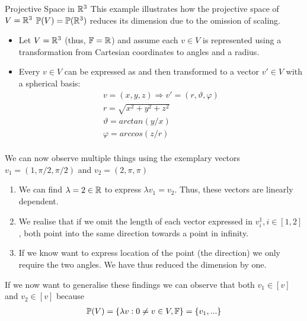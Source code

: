 \begin{exampleBox}{Projective Space in $\mathbb{R}^3$}
    This example illustrates how the projective space of $V = \mathbb{R}^3$ $\mathbb{P}(V) = \mathbb{P}(\mathbb{R}^3)$ reduces its dimension due to the omission of scaling.
    \begin{itemize}
        \item Let $V = \mathbb{R}^3$ (thus, $\mathbb{F} = \mathbb{R}$) and assume each $v \in V$ is represented using a transformation from Cartesian coordinates to angles and a radius.
        \item Every $v \in V$ can be expressed as and then transformed to a vector $v' \in V$ with a spherical basis: 
            \begin{gather*}
                v = (x,y,z) \Rightarrow v' =  (r, \vartheta,\varphi)  \\
                r = \sqrt{x^2+y^2+z^2} \\
                \vartheta = arctan(y/x) \\
                \varphi = arccos(z/r) \\   
            \end{gather*}
    \end{itemize}  
    
    We can now observe multiple things using the exemplary vectors $v_1 = (1, \pi/2,\pi/2)$ and $v_2 = (2, \pi,\pi)$
    \begin{enumerate}
        \item We can find $\lambda = 2 \in \mathbb{R}$ to express $\lambda v_1 = v_2$. Thus, these vectors are linearly dependent.
        \item We realise that if we omit the length of each vector expressed in $v_i^1, i \in [1,2]$, both point into the same direction towards a point in infinity.
        \item If we know want to express location of the point (the direction) we only require the two angles. We have thus reduced the dimension by one.
    \end{enumerate}
    If we now want to generalise these findings we can observe that both $v_1 \in [v]$ and $v_2 \in [v]$ because
    \begin{gather*}
        \mathbb{P}(V) = \{ \lambda v :  0 \neq v\in V, \mathbb{F} \} = \{ v_1, ...\} 
    \end{gather*}
    
\end{exampleBox}

